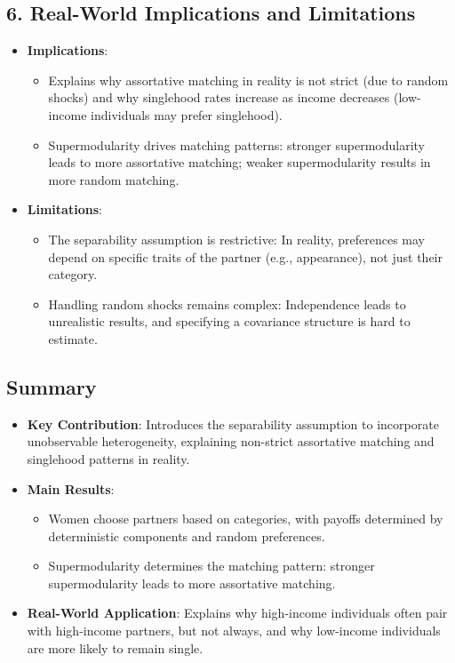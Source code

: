 \subsection*{6. Real-World Implications and Limitations}
\begin{itemize}
    \item \textbf{Implications}:
    \begin{itemize}
        \item Explains why assortative matching in reality is not strict (due to random shocks) and why singlehood rates increase as income decreases (low-income individuals may prefer singlehood).
        \item Supermodularity drives matching patterns: stronger supermodularity leads to more assortative matching; weaker supermodularity results in more random matching.
    \end{itemize}
    \item \textbf{Limitations}:
    \begin{itemize}
        \item The separability assumption is restrictive: In reality, preferences may depend on specific traits of the partner (e.g., appearance), not just their category.
        \item Handling random shocks remains complex: Independence leads to unrealistic results, and specifying a covariance structure is hard to estimate.
    \end{itemize}
\end{itemize}

\subsection*{Summary}
\begin{itemize}
    \item \textbf{Key Contribution}: Introduces the separability assumption to incorporate unobservable heterogeneity, explaining non-strict assortative matching and singlehood patterns in reality.
    \item \textbf{Main Results}:
    \begin{itemize}
        \item Women choose partners based on categories, with payoffs determined by deterministic components and random preferences.
        \item Supermodularity determines the matching pattern: stronger supermodularity leads to more assortative matching.
    \end{itemize}
    \item \textbf{Real-World Application}: Explains why high-income individuals often pair with high-income partners, but not always, and why low-income individuals are more likely to remain single.
\end{itemize}
